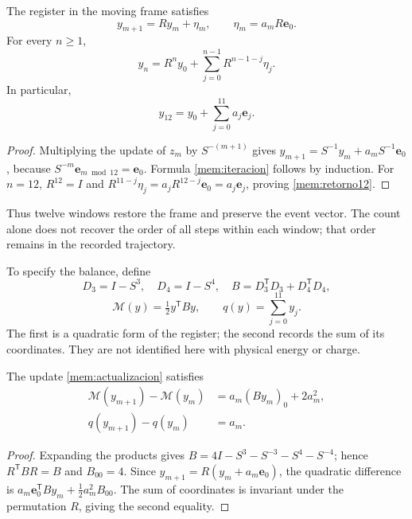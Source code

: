 \begin{proposition}
\label{mem:prop-actualizacion}
The register in the moving frame satisfies
\begin{equation}
 y_{m+1}=Ry_m+\eta_m,\qquad
 \eta_m=a_mR\mathbf e_0.
 \label{mem:actualizacion}
\end{equation}
For every \(n\geq1\),
\begin{equation}
 y_n=R^ny_0+\sum_{j=0}^{n-1}R^{n-1-j}\eta_j.
 \label{mem:iteracion}
\end{equation}
In particular,
\begin{equation}
 y_{12}=y_0+\sum_{j=0}^{11}a_j\mathbf e_j.
 \label{mem:retorno12}
\end{equation}
\end{proposition}
\begin{proof}
Multiplying the update of \(z_m\) by \(S^{-(m+1)}\) gives
\(y_{m+1}=S^{-1}y_m+a_mS^{-1}\mathbf e_0\), because
\(S^{-m}\mathbf e_{m\bmod12}=\mathbf e_0\).
Formula \eqref{mem:iteracion} follows by induction.
For \(n=12\), \(R^{12}=I\) and
\(R^{11-j}\eta_j=a_jR^{12-j}\mathbf e_0=a_j\mathbf e_j\),
proving \eqref{mem:retorno12}.
\end{proof}

Thus twelve windows restore the frame and preserve the event vector.
The count alone does not recover the order of all steps
within each window; that order remains in the recorded trajectory.

To specify the balance, define
\[
 D_3=I-S^3,\quad D_4=I-S^4,\quad
 B=D_3^{\mathsf T}D_3+D_4^{\mathsf T}D_4,
\]
\[
 \mathcal M(y)=\tfrac12y^{\mathsf T}By,
 \qquad q(y)=\sum_{j=0}^{11}y_j.
\]
The first is a quadratic form of the register; the second records
the sum of its coordinates. They are not identified here with physical energy or charge.

\begin{proposition}
\label{mem:prop-balance}
The update \eqref{mem:actualizacion} satisfies
\begin{equation}
 \begin{aligned}
 \mathcal M(y_{m+1})-\mathcal M(y_m)
   &=a_m(By_m)_0+2a_m^2,\\
 q(y_{m+1})-q(y_m)&=a_m.
 \end{aligned}
 \label{mem:balance}
\end{equation}
\end{proposition}
\begin{proof}
Expanding the products gives
\(B=4I-S^3-S^{-3}-S^4-S^{-4}\); hence
\(R^{\mathsf T}BR=B\) and \(B_{00}=4\).
Since \(y_{m+1}=R(y_m+a_m\mathbf e_0)\), the quadratic difference
is \(a_m\mathbf e_0^{\mathsf T}By_m+\tfrac12a_m^2B_{00}\).
The sum of coordinates is invariant under the permutation \(R\),
giving the second equality.
\end{proof}

